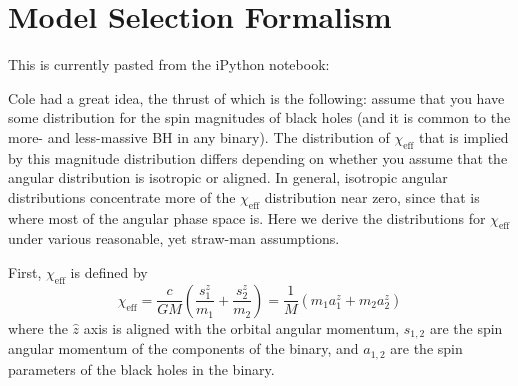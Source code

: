 \documentclass[modern]{aastex61}
\newcommand{\chieff}{\chi_\mathrm{eff}}
\begin{document}
\section{Model Selection Formalism}
\label{sec:formalism}

This is currently pasted from the iPython notebook:

Cole had a great idea, the thrust of which is the following: assume
that you have some distribution for the spin magnitudes of black holes
(and it is common to the more- and less-massive BH in any binary).
The distribution of $\chieff$ that is implied by this magnitude
distribution differs depending on whether you assume that the angular
distribution is isotropic or aligned.  In general, isotropic angular
distributions concentrate more of the $\chieff$ distribution near
zero, since that is where most of the angular phase space is.  Here we
derive the distributions for $\chieff$ under various reasonable, yet
straw-man assumptions.

First, $\chieff$ is defined by
\begin{equation}
\chieff = \frac{c}{GM} \left( \frac{s_1^z}{m_1} + \frac{s_2^z}{m_2}
\right) = \frac{1}{M} \left( m_1 a_1^z + m_2 a_2^z \right)
\end{equation}
where the $\hat{z}$ axis is aligned with the orbital angular momentum,
$s_{1,2}$ are the spin angular momentum of the components of the
binary, and $a_{1,2}$ are the spin parameters of the black holes in
the binary.
\end{document}
